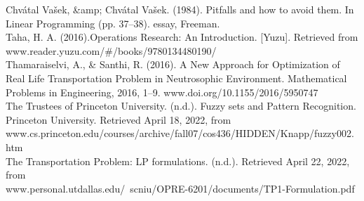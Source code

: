 \documentclass{article}
\begin{document}
Chvátal Vašek, &amp; Chvátal Vašek. (1984). Pitfalls and how to avoid them. In Linear Programming (pp. 37–38). essay, Freeman. \\

Taha, H. A. (2016).Operations Research: An Introduction. [Yuzu]. Retrieved from\\ www.reader.yuzu.com/\#/books/9780134480190/\\

Thamaraiselvi, A., \& Santhi, R. (2016). A New Approach for Optimization of Real Life Transportation Problem in Neutrosophic Environment. Mathematical Problems in Engineering, 2016, 1–9. www.doi.org/10.1155/2016/5950747\\ 

The Trustees of Princeton University. (n.d.). Fuzzy sets and Pattern Recognition. Princeton University. Retrieved April 18, 2022, from\\ www.cs.princeton.edu/courses/archive/fall07/cos436/HIDDEN/Knapp/fuzzy002.htm \\

The Transportation Problem: LP formulations. (n.d.). Retrieved April 22, 2022, from\\ www.personal.utdallas.edu/~scniu/OPRE-6201/documents/TP1-Formulation.pdf\\
\end{document}
